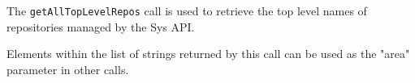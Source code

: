 The \verb+getAllTopLevelRepos+ call is used to retrieve the top level names of repositories managed by the Sys API.

Elements within the list of strings returned by this call can be used as the "area" parameter in other calls.
